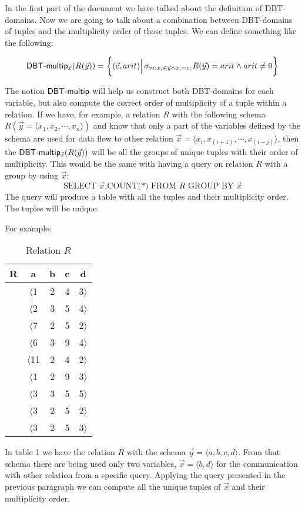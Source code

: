 \documentclass[12pt]{article}
\begin{document}
In the first part of the document we have talked about the definition of DBT-domains. Now we are going to talk about a combination between DBT-domains of tuples and the multiplicity order of those tuples. We can define something like the following:

$$\textsf{DBT-multip}{}_{\vec x}(R(\vec y))=\bigg\{(\vec c,arit)\Big|\,\sigma_{\forall i:x_i\in\vec{y}\land x_{i}=c_{i}}R(\vec y)= arit \land arit \not= 0\bigg\}$$ 

The notion $\textsf{DBT-multip}{}$ will help us construct both DBT-domains for each variable, but also compute the correct order of multiplicity of a tuple within a relation. If we have, for example, a relation $R$ with the following schema $R(\vec y=\langle x_1,x_2,\cdots,x_n\rangle)$ and know that only a part of the variables defined by the schema are used for data flow to other relation $\vec x=\langle x_i,x_{(i+1)},\cdots,x_{(i+j)}\rangle$, then the $\textsf{DBT-multip}{}_{\vec x}(R(\vec y))$ will be all the groups of unique tuples with their order of multiplicity. This would be the same with having a query on relation $R$ with a group by using $\vec x$:
$$\mbox{SELECT }\vec{x} \mbox{,COUNT(*) FROM }R \mbox{ GROUP BY }\vec{x}$$
The query will produce a table with all the tuples and their multiplicity order. The tuples will be unique.

For example:

\begin{table}[H]
\centering
\begin{tabular}{c c c c c}
	R & a & b & c & d\\ [0.2ex]
	\hline
	  & $\langle $1 & 2 & 4& 3$\rangle$\\
	  & $\langle $2 & 3 & 5 & 4$\rangle$\\
	  & $\langle $7 & 2 & 5 & 2$\rangle$\\
	  & $\langle $6 & 3 & 9 & 4$\rangle$\\
	  & $\langle $11 & 2 & 4 & 2$\rangle$\\
	  & $\langle $1 & 2 & 9 & 3$\rangle$\\
	  & $\langle $3 & 3 & 5 & 5$\rangle$\\
	  & $\langle $3 & 2 & 5 & 2$\rangle$\\
	  & $\langle $3 & 2 & 5 & 3$\rangle$\\
\end{tabular}
\caption{Relation $R$}
\end{table}

In table 1 we have the relation $R$ with the schema $\vec y=\langle a,b,c,d\rangle$. From that schema there are being used only two variables, $\vec x=\langle b,d\rangle$ for the communication with other relation from a specific query. Applying the query presented in the previous paragraph we can compute all the unique tuples of $\vec x$ and their multiplicity order.
\end{document}
